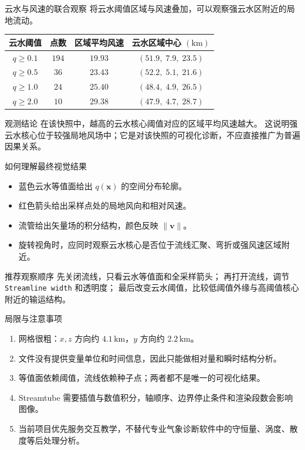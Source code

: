 \documentclass[aspectratio=169,11pt]{ctexbeamer}
\newcommand{\vx}{\mathbf x}
\newcommand{\vv}{\mathbf v}
\begin{document}
\begin{frame}{云水与风速的联合观察}
  \small
  将云水阈值区域与风速叠加，可以观察强云水区附近的局地流动。

  \begin{tabular}{cccc}
    \toprule
    云水阈值 & 点数 & 区域平均风速 & 云水区域中心 $(\mathrm{km})$\\
    \midrule
    $q\ge0.1$ & $194$ & $19.93$ & $(51.9,\;7.9,\;23.5)$\\
    $q\ge0.5$ & $36$ & $23.43$ & $(52.2,\;5.1,\;21.6)$\\
    $q\ge1.0$ & $24$ & $25.40$ & $(48.4,\;4.9,\;26.5)$\\
    $q\ge2.0$ & $10$ & $29.38$ & $(47.9,\;4.7,\;28.7)$\\
    \bottomrule
  \end{tabular}

  \vspace{0.8em}
  \begin{block}{观测结论}
    在该快照中，越高的云水核心阈值对应的区域平均风速越大。
    这说明强云水核心位于较强局地风场中；它是对该快照的可视化诊断，不应直接推广为普遍因果关系。
  \end{block}
\end{frame}

\begin{frame}{如何理解最终视觉结果}
  \small
  \begin{itemize}
    \item 蓝色云水等值面给出 $q(\vx)$ 的空间分布轮廓。
    \item 红色箭头给出采样点处的局地风向和相对风速。
    \item 流管给出矢量场的积分结构，颜色反映 $\|\vv\|$。
    \item 旋转视角时，应同时观察云水核心是否位于流线汇聚、弯折或强风速区域附近。
  \end{itemize}

  \begin{block}{推荐观察顺序}
    先关闭流线，只看云水等值面和全采样箭头；
    再打开流线，调节 \texttt{Streamline width} 和透明度；
    最后改变云水阈值，比较低阈值外缘与高阈值核心附近的输运结构。
  \end{block}
\end{frame}

\begin{frame}{局限与注意事项}
  \small
  \begin{enumerate}
    \item 网格很粗：$x,z$ 方向约 $4.1\,\mathrm{km}$，$y$ 方向约 $2.2\,\mathrm{km}$。
    \item 文件没有提供变量单位和时间信息，因此只能做相对量和瞬时结构分析。
    \item 等值面依赖阈值，流线依赖种子点；两者都不是唯一的可视化结果。
    \item Streamtube 需要插值与数值积分，轴顺序、边界停止条件和渲染段数会影响图像。
    \item 当前项目优先服务交互教学，不替代专业气象诊断软件中的守恒量、涡度、散度等后处理分析。
  \end{enumerate}
\end{frame}
\end{document}
